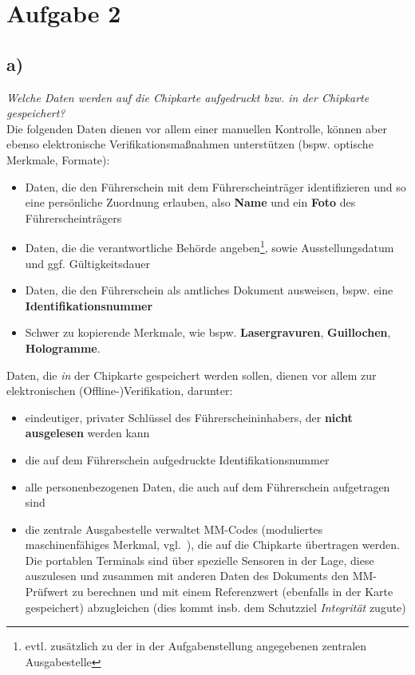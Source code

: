 \chapter{Aufgabe 2}

\section{a)}

\textit{Welche Daten werden auf die Chipkarte aufgedruckt bzw. in der Chipkarte
gespeichert?}\\

\noindent
Die folgenden Daten dienen vor allem einer manuellen Kontrolle, können aber ebenso elektronische Verifikationsmaßnahmen unterstützen (bspw. optische Merkmale, Formate):

\begin{itemize}
    \itemsep0.5em
    \item Daten, die den Führerschein mit dem Führerscheinträger identifizieren und so eine persönliche Zuordnung erlauben, also \textbf{Name} und ein \textbf{Foto} des Führerscheinträgers
    \item Daten, die die verantwortliche Behörde angeben\footnote{
        evtl. zusätzlich zu der in der Aufgabenstellung angegebenen zentralen Ausgabestelle
    }, sowie Ausstellungsdatum und ggf. Gültigkeitsdauer
    \item Daten, die den Führerschein als amtliches Dokument ausweisen, bspw. eine \textbf{Identifikationsnummer}
    \item Schwer zu kopierende Merkmale, wie bspw. \textbf{Lasergravuren}, \textbf{Guillochen}, \textbf{Hologramme}.
\end{itemize}

\noindent
Daten, die \textit{in} der Chipkarte gespeichert werden sollen, dienen vor allem zur elektronischen (Offline-)Verifikation, darunter:

\begin{itemize}
    \itemsep0.5em
    \item eindeutiger, privater Schlüssel des Führerscheininhabers, der \textbf{nicht ausgelesen} werden kann
    \item die auf dem Führerschein aufgedruckte Identifikationsnummer
    \item alle personenbezogenen Daten, die auch auf dem Führerschein aufgetragen sind
    \item die zentrale Ausgabestelle verwaltet MM-Codes (moduliertes maschinenfähiges Merkmal, vgl.~\cite[74]{ITS5}), die auf die Chipkarte übertragen werden.
    Die portablen Terminals sind über spezielle Sensoren in der Lage, diese auszulesen und zusammen mit anderen Daten des Dokuments den MM-Prüfwert zu berechnen und mit einem Referenzwert (ebenfalls in der Karte gespeichert) abzugleichen (dies kommt insb. dem Schutzziel \textit{Integrität} zugute)
\end{itemize}

